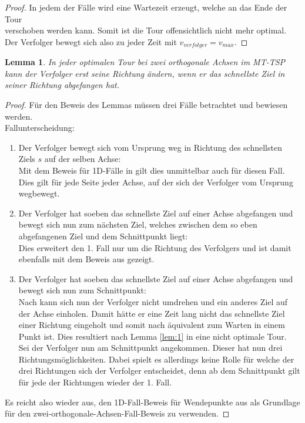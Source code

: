 \documentclass[german,version-2019-11]{uzl-thesis}
\newtheorem{lem}{Lemma}
\begin{document}
\begin{proof}
In jedem der Fälle wird eine Wartezeit erzeugt, welche an das Ende der Tour \\verschoben werden kann. Somit ist die Tour offensichtlich nicht mehr optimal. Der Verfolger bewegt sich also zu jeder Zeit mit $v_{verfolger} = v_{max}$.
\end{proof}

\begin{lem}
In jeder optimalen Tour bei zwei orthogonale Achsen im MT-TSP kann der Verfolger erst seine Richtung ändern, wenn er das schnellste Ziel in seiner Richtung abgefangen hat.
\end{lem}

\begin{proof}
Für den Beweis des Lemmas müssen drei Fälle betrachtet und bewiesen werden.\\
Fallunterscheidung:\\
\begin{enumerate}
\item Der Verfolger bewegt sich vom Ursprung weg in Richtung des schnellsten Ziels $s$ auf der selben Achse: \\
Mit dem Beweis für 1D-Fälle in \cite{helvig} gilt dies unmittelbar auch für diesen Fall. Dies gilt für jede Seite jeder Achse, auf der sich der Verfolger vom Ursprung wegbewegt.

\item Der Verfolger hat soeben das schnellste Ziel auf einer Achse abgefangen und bewegt sich nun zum nächsten Ziel, welches zwischen dem so eben abgefangenen Ziel und dem Schnittpunkt liegt:\\
Dies erweitert den 1. Fall nur um die Richtung des Verfolgers und ist damit ebenfalls mit dem Beweis aus \cite{helvig} gezeigt.

\item Der Verfolger hat soeben das schnellste Ziel auf einer Achse abgefangen und bewegt sich nun zum Schnittpunkt:\\
Nach \cite{helvig} kann sich nun der Verfolger nicht umdrehen und ein anderes Ziel auf der Achse einholen. Damit hätte er eine Zeit lang nicht das schnellste Ziel einer Richtung eingeholt und somit nach \cite{helvig} äquivalent zum Warten in einem Punkt ist. Dies resultiert nach Lemma \ref{lem:1} in eine nicht optimale Tour.\\
Sei der Verfolger nun am Schnittpunkt angekommen. Dieser hat nun drei Richtungsmöglichkeiten. Dabei spielt es allerdings keine Rolle für welche der drei Richtungen sich der Verfolger entscheidet, denn ab dem Schnittpunkt gilt für jede der Richtungen wieder der 1. Fall.
\end{enumerate} \noindent
Es reicht also wieder aus, den 1D-Fall-Beweis für Wendepunkte aus \cite{helvig} als Grundlage für den zwei-orthogonale-Achsen-Fall-Beweis zu verwenden.
\end{proof}
\end{document}
